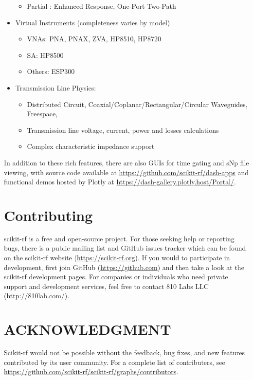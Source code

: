 \documentclass{IEEEjmw}
\begin{document}
\begin{itemize}
\begin{itemize}
		\item Partial : Enhanced Response, One-Port Two-Path
	\end{itemize}
\item	Virtual Instruments (completeness varies by model)
	\begin{itemize}
		\item VNAs: PNA, PNAX, ZVA, HP8510, HP8720
		\item SA: HP8500
		\item Others: ESP300
	\end{itemize}
\item	Transmission Line Physics:
	\begin{itemize}
		\item Distributed Circuit, Coaxial/Coplanar/Rectangular/Circular Waveguides, Freespace, 
		\item Transmission line voltage, current, power and losses calculations
		\item Complex characteristic impedance support
	\end{itemize}

\end{itemize}

In addition to these rich features, there are also GUIs for time gating and sNp file viewing, with source code available at \url{https://github.com/scikit-rf/dash-apps} and functional demos hosted by Plotly at \url{https://dash-gallery.plotly.host/Portal/}. 

\section{Contributing}
scikit-rf is a free and open-source project. For those seeking help or reporting bugs, there is a public mailing list and GitHub issues tracker which can be found on the scikit-rf website (\url{https://scikit-rf.org}). If you would to participate in development, first join GitHub (\url{https://github.com}) and then take a look at the scikit-rf development pages. For companies or individuals who need private support and development services, feel free to contact 810 Labs LLC (\url{http://810lab.com/}).

\section*{ACKNOWLEDGMENT}
Scikit-rf would not be possible without the feedback, bug fixes, and new features contributed by its user community. For a complete list of contributers, see \url{https://github.com/scikit-rf/scikit-rf/graphs/contributors}.




\end{document}
